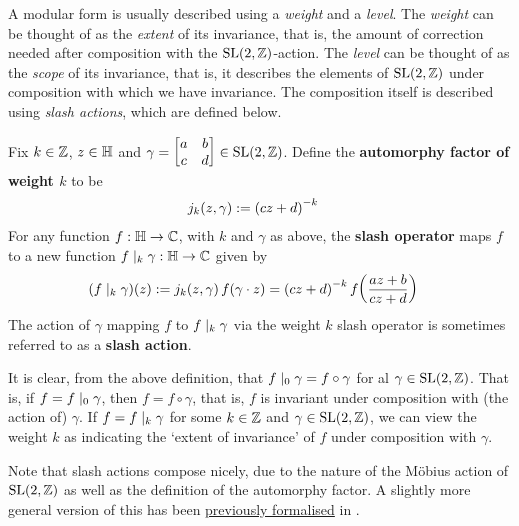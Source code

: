 A modular form is usually described using a \textit{weight} and a \textit{level}. The \textit{weight} can be thought of as the \textit{extent} of its invariance, that is, the amount of correction needed after composition with the $\operatorname{SL}\!\left( 2, \mathbb{Z} \right)$-action. The \textit{level} can be thought of as the \textit{scope} of its invariance, that is, it describes the elements of $\operatorname{SL}\!\left( 2, \mathbb{Z} \right)$ under composition with which we have invariance. The composition itself is described using \textit{slash actions}, which are defined below.

\begin{boxdefinition}\label{Ch2:Def:Aut_Factor_Slash_Action}
    Fix $k \in \mathbb{Z}$, $z \in \mathbb{H}$ and $\gamma = \begin{bmatrix} a & b \\ c & d \end{bmatrix} \in \operatorname{SL}\!\left( 2, \mathbb{Z} \right)$. Define the \textbf{automorphy factor of weight $k$} to be
    \begin{align}
        j_k\!\left( z, \gamma \right) &:= \left( cz + d \right)^{-k}
        \label{Ch2:Eq:AutomorphyFactor_def}
    \end{align}
    For any function $f : \mathbb{H} \to \mathbb{C}$, with $k$ and $\gamma$ as above, the \textbf{slash operator} maps $f$ to a new function $f \mid_k \gamma : \mathbb{H} \to \mathbb{C}$ given by
    \begin{align}
        \left( f \mid_{k} {\gamma} \right)\!\left( z \right) &:= j_k\!\left( z, \gamma \right) f\!\left( \gamma \cdot z \right) = \left( cz + d \right)^{-k} f\!\left( \frac{az + b}{cz + d} \right)
        \label{Ch2:Eq:SlashAction_def}
    \end{align}
    The action of $\gamma$ mapping $f$ to $f \mid_k \gamma$ via the weight $k$ slash operator is sometimes referred to as a \textbf{slash action}.
\end{boxdefinition}

It is clear, from the above definition, that $f \mid_0 \gamma = f \circ \gamma$ for al $\gamma \in \operatorname{SL}\!\left( 2, \mathbb{Z} \right)$. That is, if $f = f \mid_0 \gamma$, then $f = f \circ \gamma$, that is, $f$ is invariant under composition with (the action of) $\gamma$. If $f = f \mid_k \gamma$ for some $k \in \mathbb{Z}$ and $\gamma \in \operatorname{SL}\!\left( 2, \mathbb{Z} \right)$, we can view the weight $k$ as indicating the `extent of invariance' of $f$ under composition with $\gamma$.

Note that slash actions compose nicely, due to the nature of the Möbius action of $\operatorname{SL}\!\left( 2, \mathbb{Z} \right)$ as well as the definition of the automorphy factor. A slightly more general version of this has been \href{https://github.com/leanprover-community/mathlib4/blob/a0370507e2922f0a329a2d8cc17e9f9148cd168d/Mathlib/NumberTheory/ModularForms/SlashActions.lean#L77}{previously formalised} in \mathlib.

